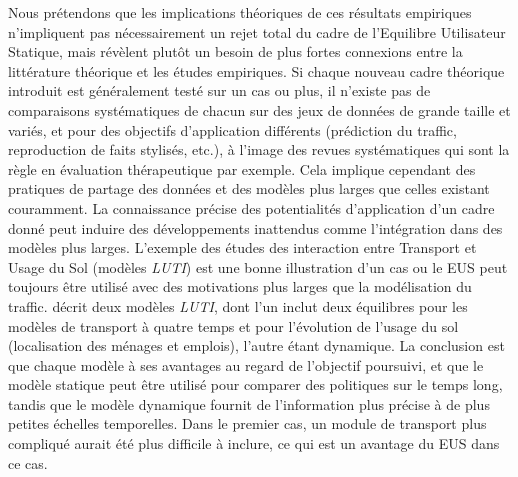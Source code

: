 {Nous prétendons que les implications théoriques de ces résultats empiriques n'impliquent pas nécessairement un rejet total du cadre de l'Equilibre Utilisateur Statique, mais révèlent plutôt un besoin de plus fortes connexions entre la littérature théorique et les études empiriques. Si chaque nouveau cadre théorique introduit est généralement testé sur un cas ou plus, il n'existe pas de comparaisons systématiques de chacun sur des jeux de données de grande taille et variés, et pour des objectifs d'application différents (prédiction du traffic, reproduction de faits stylisés, etc.), à l'image des revues systématiques qui sont la règle en évaluation thérapeutique par exemple. Cela implique cependant des pratiques de partage des données et des modèles plus larges que celles existant couramment. La connaissance précise des potentialités d'application d'un cadre donné peut induire des développements inattendus comme l'intégration dans des modèles plus larges. L'exemple des études des interaction entre Transport et Usage du Sol (modèles \emph{LUTI}) est une bonne illustration d'un cas ou le EUS peut toujours être utilisé avec des motivations plus larges que la modélisation du traffic. \cite{kryvobokov2013comparison} décrit deux modèles \emph{LUTI}, dont l'un inclut deux équilibres pour les modèles de transport à quatre temps et pour l'évolution de l'usage du sol (localisation des ménages et emplois), l'autre étant dynamique. La conclusion est que chaque modèle à ses avantages au regard de l'objectif poursuivi, et que le modèle statique peut être utilisé pour comparer des politiques sur le temps long, tandis que le modèle dynamique fournit de l'information plus précise à de plus petites échelles temporelles. Dans le premier cas, un module de transport plus compliqué aurait été plus difficile à inclure, ce qui est un avantage du EUS dans ce cas.
}


